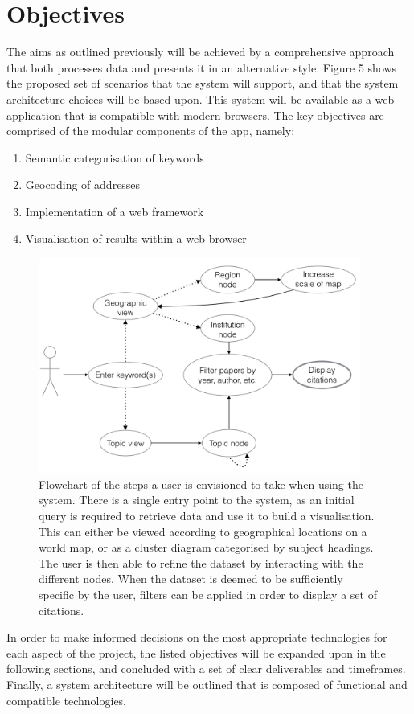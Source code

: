 \documentclass[PROP_AGutteridge_CS.tex]{subfiles}
\begin{document}
\chapter{Objectives}
The aims as outlined previously will be achieved by a comprehensive approach that both processes data and presents it in an alternative style. Figure 5 shows the proposed set of scenarios that the system will support, and that the system architecture choices will be based upon. This system will be available as a web application that is compatible with modern browsers. The key objectives are comprised of the modular components of the app, namely:
\begin{enumerate}
\item{Semantic categorisation of keywords}
\item{Geocoding of addresses}
\item{Implementation of a web framework}
\item{Visualisation of results within a web browser} 
\end{enumerate}

\begin{figure}[h!]
	\centering
	\includegraphics[width=300pt]{../lib/images/user-flowchart}
	\caption{Flowchart of the steps a user is envisioned to take when using the system. There is a single entry point to the system, as an initial query is required to retrieve data and use it to build a visualisation. This can either be viewed according to geographical locations on a world map, or as a cluster diagram categorised by subject headings. The user is then able to refine the dataset by interacting with the different nodes. When the dataset is deemed to be sufficiently specific by the user, filters can be applied in order to display a set of citations.}
\end{figure}

\noindent In order to make informed decisions on the most appropriate technologies for each aspect of the project, the listed objectives will be expanded upon in the following sections, and concluded with a set of clear deliverables and timeframes. Finally, a system architecture will be outlined that is composed of functional and compatible technologies.
\end{document}
